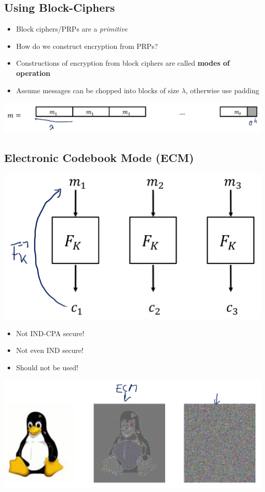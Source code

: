 	\subsection{Using Block-Ciphers}
		\begin{itemize}
			\item Block ciphers/PRPs are a \textit{primitive}
			\item How do we construct encryption from PRPs?
			\item Constructions of encryption from block ciphers are called \textbf{modes of operation}
			\item Assume messages can be chopped into blocks of size $\lambda$, otherwise use padding
		\end{itemize}
	    \begin{center}
			\includegraphics[width=160mm]{Graphics/Block Ciphers/bc6.png}
		\end{center}
	
	\subsection{Electronic Codebook Mode (ECM)}
		\begin{center}
			\includegraphics[width=140mm]{Graphics/Block Ciphers/bc7.png}
		\end{center}
		\begin{itemize}
			\item Not IND-CPA secure!
			\item Not even IND secure!
			\item Should not be used!
		\end{itemize}
		\begin{center}
			\includegraphics[width=160mm]{Graphics/Block Ciphers/bc8.png}
		\end{center}
	
